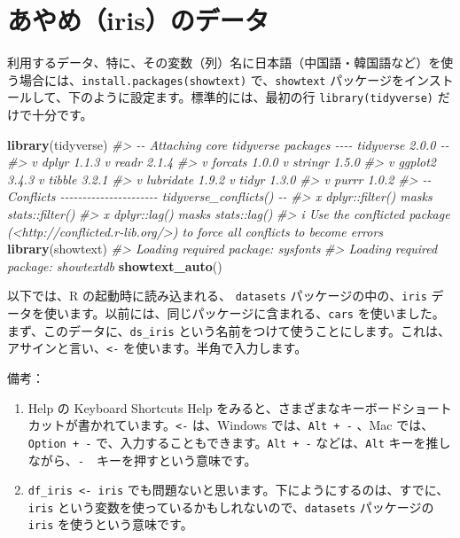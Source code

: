 \documentclass[
  xelatex, ja=standard]{bxjsbook}
\newenvironment{Shaded}{\begin{snugshade}}{\end{snugshade}}
\newcommand{\CommentTok}[1]{\textcolor[rgb]{0.56,0.35,0.01}{\textit{#1}}}
\newcommand{\FunctionTok}[1]{\textcolor[rgb]{0.13,0.29,0.53}{\textbf{#1}}}
\newcommand{\NormalTok}[1]{#1}
\providecommand{\tightlist}{%
  \setlength{\itemsep}{0pt}\setlength{\parskip}{0pt}}
\theoremstyle{definition}
\theoremstyle{definition}
\theoremstyle{definition}
\theoremstyle{definition}
\theoremstyle{remark}
\begin{document}
\hypertarget{ux3042ux3084ux3081irisux306eux30c7ux30fcux30bf}{%
\section{あやめ（iris）のデータ}\label{ux3042ux3084ux3081irisux306eux30c7ux30fcux30bf}}

利用するデータ、特に、その変数（列）名に日本語（中国語・韓国語など）を使う場合には、\texttt{install.packages(\textquotesingle{}showtext\textquotesingle{})} で、\texttt{showtext} パッケージをインストールして、下のように設定ます。標準的には、最初の行 \texttt{library(tidyverse)} だけで十分です。

\begin{Shaded}
\begin{Highlighting}[]
\FunctionTok{library}\NormalTok{(tidyverse)}
\CommentTok{\#\textgreater{} {-}{-} Attaching core tidyverse packages {-}{-}{-}{-} tidyverse 2.0.0 {-}{-}}
\CommentTok{\#\textgreater{} v dplyr     1.1.3     v readr     2.1.4}
\CommentTok{\#\textgreater{} v forcats   1.0.0     v stringr   1.5.0}
\CommentTok{\#\textgreater{} v ggplot2   3.4.3     v tibble    3.2.1}
\CommentTok{\#\textgreater{} v lubridate 1.9.2     v tidyr     1.3.0}
\CommentTok{\#\textgreater{} v purrr     1.0.2     }
\CommentTok{\#\textgreater{} {-}{-} Conflicts {-}{-}{-}{-}{-}{-}{-}{-}{-}{-}{-}{-}{-}{-}{-}{-}{-}{-}{-}{-}{-}{-} tidyverse\_conflicts() {-}{-}}
\CommentTok{\#\textgreater{} x dplyr::filter() masks stats::filter()}
\CommentTok{\#\textgreater{} x dplyr::lag()    masks stats::lag()}
\CommentTok{\#\textgreater{} i Use the conflicted package (\textless{}http://conflicted.r{-}lib.org/\textgreater{}) to force all conflicts to become errors}
\FunctionTok{library}\NormalTok{(showtext) }
\CommentTok{\#\textgreater{} Loading required package: sysfonts}
\CommentTok{\#\textgreater{} Loading required package: showtextdb}
\FunctionTok{showtext\_auto}\NormalTok{()}
\end{Highlighting}
\end{Shaded}

以下では、R の起動時に読み込まれる、 \texttt{datasets} パッケージの中の、\texttt{iris} データを使います。以前には、同じパッケージに含まれる、\texttt{cars} を使いました。まず、このデータに、\texttt{ds\_iris} という名前をつけて使うことにします。これは、アサインと言い、\texttt{\textless{}-} を使います。半角で入力します。

備考：

\begin{enumerate}
\def\labelenumi{\arabic{enumi}.}
\tightlist
\item
  Help の Keyboard Shortcuts Help をみると、さまざまなキーボードショートカットが書かれています。\texttt{\textless{}-} は、Windows では、\texttt{Alt\ +\ -} 、Mac では、\texttt{Option\ +\ -} で、入力することもできます。\texttt{Alt\ +\ -} などは、\texttt{Alt} キーを推しながら、\texttt{-}　キーを押すという意味です。
\item
  \texttt{df\_iris\ \textless{}-\ iris} でも問題ないと思います。下にようにするのは、すでに、\texttt{iris} という変数を使っているかもしれないので、\texttt{datasets} パッケージの \texttt{iris} を使うという意味です。
\end{enumerate}
\end{document}
